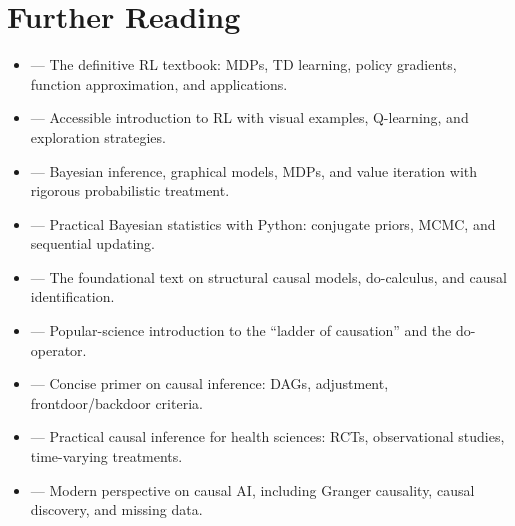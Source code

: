     \section{Further Reading}
    \begin{tcbitemize}[ skin=sectionraster ]

    \tcbitem[title=Recommended Sources for Reinforcement Learning and Causality, raster multicolumn=6]
    \begin{itemize}
        \item {} --- The definitive RL textbook: MDPs, TD learning, policy gradients, function approximation, and applications.
        \item {} --- Accessible introduction to RL with visual examples, Q-learning, and exploration strategies.
        \item {} --- Bayesian inference, graphical models, MDPs, and value iteration with rigorous probabilistic treatment.
        \item {} --- Practical Bayesian statistics with Python: conjugate priors, MCMC, and sequential updating.
        \item {} --- The foundational text on structural causal models, do-calculus, and causal identification.
        \item {} --- Popular-science introduction to the ``ladder of causation'' and the do-operator.
        \item {} --- Concise primer on causal inference: DAGs, adjustment, frontdoor/backdoor criteria.
        \item {} --- Practical causal inference for health sciences: RCTs, observational studies, time-varying treatments.
        \item {} --- Modern perspective on causal AI, including Granger causality, causal discovery, and missing data.
    \end{itemize}

    \end{tcbitemize}
